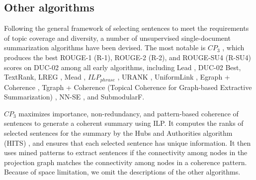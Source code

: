 \documentclass[a4paper,twoside]{article}
\begin{document}
\subsection{Other algorithms}
\label{sec:other}

Following the general framework of selecting sentences to meet the requirements of topic coverage and diversity,
a number of unsupervised single-document summarization algorithms have been devised.
The most notable is $CP_3$ \cite{parveen2016}, which produces the best ROUGE-1 (R-1), ROUGE-2 (R-2), and ROUGE-SU4 (R-SU4) scores on DUC-02
among all early algorithms,
including
Lead \cite{ParveenR015}, DUC-02 Best, TextRank, LREG \cite{ChengL16a},
Mead \cite{radev2004}, $ILP_{phrase}$ \cite{woodsend2010}, URANK \cite{wan2010}, UniformLink \cite{WanX10}, Egraph + Coherence \cite{Parveen015},
Tgraph + Coherence (Topical Coherence for Graph-based Extractive Summarization) \cite{ParveenR015},
NN-SE \cite{ChengL16a}, and SubmodularF.

$CP_3$ maximizes importance, non-redundancy, and pattern-based coherence of sentences to generate a coherent summary using ILP. 
It computes %
the ranks of selected sentences for the summary by the Hubs and Authorities algorithm (HITS) \cite{kleinberg1999}, %
and ensures that each selected sentence has unique information. %
It then uses mined patterns to extract sentences if the connectivity among nodes in the projection graph matches the connectivity among nodes in a coherence pattern. Because of space limitation, we omit the descriptions of the other algorithms.
\end{document}

